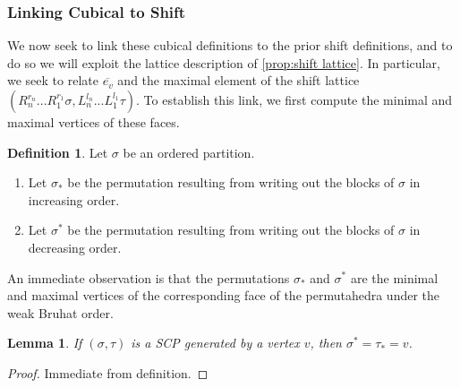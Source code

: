 \documentclass{amsart}
\newtheorem{lemma}[theorem]{Lemma}
\theoremstyle{definition}
\newtheorem{definition}[theorem]{Definition}
\newcommand{\maxsubdivpairsv}{\overline{e_v}}
\begin{document}
\subsubsection{Linking Cubical to Shift}

We now seek to link these cubical definitions to the prior shift definitions, and to do so we will exploit the lattice description of \cref{prop:shift lattice}.
In particular, we seek to relate $\maxsubdivpairsv$ and the maximal element of the shift lattice $(R^{r_n}_{n}...R^{r_{1}}_{1}\sigma, L^{l_n}_{n}...L^{l_{1}}_{1}\tau)$.
To establish this link, we first compute the minimal and maximal vertices of these faces.

\begin{definition}
Let $\sigma$ be an ordered partition. 
\begin{enumerate}
    \item Let $\sigma_*$ be the permutation resulting from writing out the blocks of $\sigma$ in increasing order.
    \item Let $\sigma^*$ be the permutation resulting from writing out the blocks of $\sigma$ in decreasing order.
\end{enumerate}
\end{definition}
An immediate observation is that the permutations $\sigma_*$ and $\sigma^*$ are the minimal and maximal vertices of the corresponding face of the permutahedra under the weak Bruhat order.
\begin{lemma}
If $(\sigma,\tau)$ is a SCP generated by a vertex $v$, then  $\sigma^* = \tau_*= v$.
\end{lemma}
\begin{proof}
Immediate from definition.
\end{proof}
\end{document}
